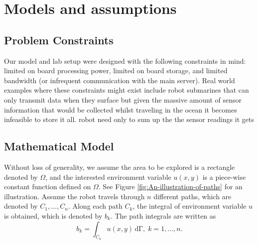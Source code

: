 \documentclass[english]{article}\usepackage[]{graphicx}\usepackage[]{color}
\begin{document}

\section{Models and assumptions}

\subsection{Problem Constraints}

Our model and lab setup were designed with the following constraints in mind: 
limited on board processing power, limited on board storage, and limited bandwidth 
(or infrequent communication with the main server). Real world examples where these constraints 
might exist include robot submarines that can only transmit data when they surface but given the massive amount of sensor information that would be collected whilst traveling in the ocean it becomes infeasible to store it all.  robot need only to sum up the the sensor readings it gets

\subsection{Mathematical Model}
Without loss of generality, we assume the area to be explored is a
rectangle denoted by $\Omega$, and the interested environment variable
$u(x,y)$ is a piece-wise constant function defined on $\Omega$.
See Figure \ref{fig:An-illustration-of-paths} for an illustration.
Assume the robot travels through $n$ different paths, which are denoted
by $C_{1},\ldots,C_{n}$. Along each path $C_{k}$, the integral of
environment variable $u$ is obtained, which is denoted by $b_{k}$.
The path integrals are written as
\begin{equation}
b_{k}=\int_{C_{k}}u(x,y)\mathrm{\,{d}\Gamma},\; k=1,\ldots,n.\label{eq:path-integral}
\end{equation}
\end{document}
